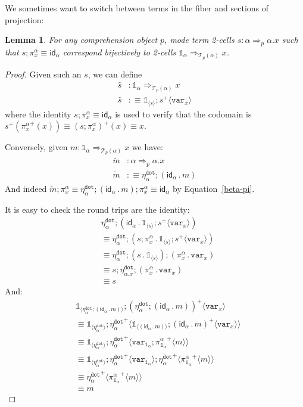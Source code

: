 \documentclass[10pt]{article}
\newtheorem{lemma}{Lemma}
\theoremstyle{definition}
\newcommand{\tcell}{\Rightarrow}
\newcommand{\id}{\mathsf{id}}
\newcommand\TrPlus[2]{\ensuremath{{#1}^+(#2)}}
\newcommand\El[2]{\mathcal{T}_{#1}(#2)}
\newcommand\bdot[0]{\mathbin{.}}
\newcommand\ApPlus[2]{\ensuremath{{#1}^+ \langle #2 \rangle }}
\newcommand{\tdot}{\ensuremath{\mathtt{dot}}}
\newcommand\One{\ensuremath{\mathds{1}}}
\newcommand\var[1]{\ensuremath{\mathtt{var}_{#1}}}
\newcommand\ApOne[1]{\ensuremath{\One_{\langle {#1} \rangle }}}
\begin{document}
We sometimes want to switch between terms in the fiber and sections of projection:
\begin{lemma}\label{sigma:total-to-fiber0} 
For any comprehension object $p$, mode term 2-cells $s : \alpha \tcell_p
\alpha.x$ such that $s;\pi^\alpha_x \equiv \id_\alpha$ correspond
bijectively to 2-cells $\One_\alpha \tcell_{\El{p}{\alpha}} x$.
\end{lemma}
\begin{proof}
Given such an $s$, we can define
\begin{align*}
\hat{s} &: \One_\alpha \tcell_{\El{p}{\alpha}} x \\
\hat{s} &:\equiv \ApOne{s};\ApPlus{s}{\var{x}}
\end{align*}
where the identity $s;\pi^\alpha_x \equiv \id_\alpha$ is used to verify that the codomain is $\TrPlus{s}{\TrPlus{\pi^\alpha_x}{x}} \equiv \TrPlus{(s;\pi^\alpha_x)}{x} \equiv x$.

Conversely, given $m : \One_\alpha \tcell_{\El{p}{\alpha}} x$ we have:
\begin{align*}
\tilde{m} &: \alpha \tcell_p \alpha.x \\
\tilde{m} &:\equiv \eta^\tdot_\alpha ; (\id_\alpha \bdot m)
\end{align*}
And indeed $\tilde{m};\pi^\alpha_x \equiv \eta^\tdot_\alpha ; (\id_\alpha \bdot m);\pi^\alpha_x \equiv \id_\alpha$ by Equation~\eqref{beta-pi}.

It is easy to check the round trips are the identity:
\begin{align*}
&\eta^\tdot_\alpha ; (\id_\alpha \bdot \ApOne{s};\ApPlus{s}{\var{x}}) \\
&\equiv \eta^\tdot_\alpha ; (s;\pi^\alpha_x \bdot \ApOne{s};\ApPlus{s}{\var{x}}) \\
&\equiv \eta^\tdot_\alpha ; (s \bdot \ApOne{s});(\pi^\alpha_x \bdot \var{x}) \\
&\equiv s;\eta^\tdot_{\alpha.x} ; (\pi^\alpha_x \bdot \var{x}) \\
&\equiv s
\end{align*}
And:
\begin{align*}
&\ApOne{\eta^\tdot_\alpha ; (\id_\alpha \bdot m)};\ApPlus{(\eta^\tdot_\alpha ; (\id_\alpha \bdot m))}{\var{x}} \\
&\equiv \ApOne{\eta^\tdot_\alpha};\ApPlus{\eta^\tdot_\alpha}{\ApOne{(\id_\alpha \bdot m)};\ApPlus{(\id_\alpha \bdot m)}{\var{x}}} \\
&\equiv \ApOne{\eta^\tdot_\alpha};\ApPlus{\eta^\tdot_\alpha}{\var{\One_\alpha};\ApPlus{\pi^\alpha_{\One_\alpha}}{m}} \\
&\equiv \ApOne{\eta^\tdot_\alpha};\ApPlus{\eta^\tdot_\alpha}{\var{\One_\alpha}};\ApPlus{\eta^\tdot_\alpha}{\ApPlus{\pi^\alpha_{\One_\alpha}}{m}} \\
&\equiv \ApPlus{\eta^\tdot_\alpha}{\ApPlus{\pi^\alpha_{\One_\alpha}}{m}} \\
&\equiv m
\end{align*}
\end{proof}
\end{document}
